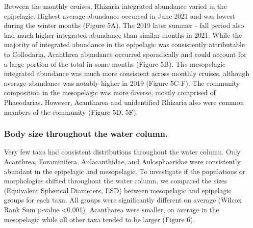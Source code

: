 \documentclass[
]{article}
\begin{document}
Between the monthly cruises, Rhizaria integrated abundance varied in the
epipelagic. Highest average abundance occurred in June 2021 and was
lowest during the winter months (Figure 5A). The 2019 later summer -
fall period also had much higher integrated abundance than similar
months in 2021. While the majority of integrated abundance in the
epipelagic was consistently attributable to Collodaria, Acanthrea
abundance occurred sporadically and could account for a large portion of
the total in some months (Figure 5B). The mesopelagic integrated
abundance was much more consistent across monthly cruises, although
average abundance was notably higher in 2019 (Figure 5C-F). The
community composition in the mesopelagic was more diverse, mostly
comprised of Phaeodarias. However, Acantharea and unidentified Rhizaria
also were common members of the community (Figure 5D, 5F).

\hypertarget{body-size-throughout-the-water-column.}{%
\subsubsection{Body size throughout the water
column.}\label{body-size-throughout-the-water-column.}}

Very few taxa had consistent distributions throughout the water column.
Only Acanthrea, Foraminifera, Aulacanthidae, and Aulosphaeridae were
consistently abundant in the epipelagic and mesopelagic. To investigate
if the populations or morphologies shifted throughout the water column,
we compared the sizes (Equivalent Spherical Diameters, ESD) between
mesopelagic and epipelagic groups for each taxa. All groups were
significantly different on average (Wilcox Rank Sum p-value
\textless0.001). Acantharea were smaller, on average in the mesopelagic
while all other taxa tended to be larger (Figure 6).
\end{document}
